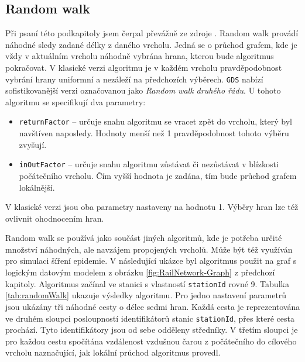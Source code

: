 \documentclass[
  program=infoi,
  biblatex=true,
  figures=true,
  glossaries=false,
  index,
  sourcecodes=true
]{kidiplom}
\begin{document}
\subsection{Random walk}
Při psaní této podkapitoly jsem čerpal převážně ze zdroje \cite{neo4jDoc}. Random walk provádí náhodné sledy zadané délky z daného vrcholu. Jedná se o průchod grafem, kde je vždy v aktuálním vrcholu náhodně vybrána hrana, kterou bude algoritmus pokračovat. V klasické verzi algoritmu je v každém vrcholu pravděpodobnost vybrání hrany uniformní a nezáleží na předchozích výběrech. \texttt{GDS} nabízí sofistikovanější verzi označovanou jako \textit{Random walk druhého řádu}. U tohoto algoritmu se specifikují dva parametry:

\begin{itemize}
\item \texttt{returnFactor} -- určuje snahu algoritmu se vracet zpět do vrcholu, který byl navštíven naposledy. Hodnoty menší než 1 pravděpodobnost tohoto výběru zvyšují.
\item \texttt{inOutFactor} -- určuje snahu algoritmu zůstávat či nezůstávat v blízkosti počátečního vrcholu. Čím vyšší hodnota je zadána, tím bude průchod grafem lokálnější.
\end{itemize}
V klasické verzi jsou oba parametry nastaveny na hodnotu 1. Výběry hran lze též ovlivnit ohodnocením hran.

Random walk se používá jako součást jiných algoritmů, kde je potřeba určité množství náhodných, ale navzájem propojených vrcholů. Může být též využíván pro simulaci šíření epidemie. V následující ukázce byl algoritmus použit na graf s logickým datovým modelem z obrázku \ref{fig:RailNetwork-Graph} z předchozí kapitoly. Algoritmus začínal ve stanici s vlastností \texttt{stationId} rovné 9. Tabulka \ref{tab:randomWalk} ukazuje výsledky algoritmu. Pro jedno nastavení parametrů jsou ukázány tři náhodné cesty o délce sedmi hran. Každá cesta je reprezentována ve druhém sloupci posloupností identifikátorů stanic \texttt{stationId}, přes které cesta prochází. Tyto identifikátory jsou od sebe odděleny středníky. V třetím sloupci je pro každou cestu spočítána vzdálenost vzdušnou čarou z počátečního do cílového vrcholu naznačující, jak lokální průchod algoritmus provedl.
\end{document}
